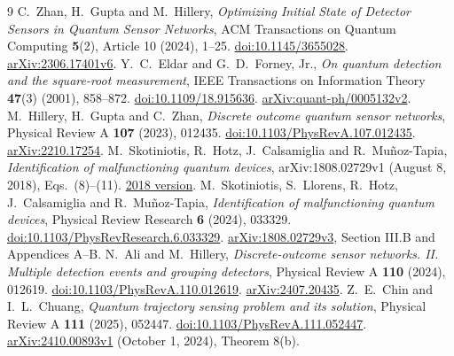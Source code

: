 \documentclass[11pt]{article}
\begin{document}
\begin{thebibliography}{9}
 C.~Zhan, H.~Gupta and M.~Hillery,
\emph{Optimizing Initial State of Detector Sensors in Quantum Sensor Networks},
ACM Transactions on Quantum Computing \textbf{5}(2), Article 10 (2024), 1--25.
\href{https://doi.org/10.1145/3655028}{doi:10.1145/3655028}.
\href{https://arxiv.org/abs/2306.17401v6}{arXiv:2306.17401v6}.
 Y.~C.~Eldar and G.~D.~Forney, Jr.,
\emph{On quantum detection and the square-root measurement},
IEEE Transactions on Information Theory \textbf{47}(3) (2001), 858--872.
\href{https://doi.org/10.1109/18.915636}{doi:10.1109/18.915636}.
\href{https://arxiv.org/abs/quant-ph/0005132v2}{arXiv:quant-ph/0005132v2}.
 M.~Hillery, H.~Gupta and C.~Zhan,
\emph{Discrete outcome quantum sensor networks},
Physical Review A \textbf{107} (2023), 012435.
\href{https://doi.org/10.1103/PhysRevA.107.012435}{doi:10.1103/PhysRevA.107.012435}.
\href{https://arxiv.org/abs/2210.17254}{arXiv:2210.17254}.
 M.~Skotiniotis, R.~Hotz, J.~Calsamiglia and
R.~Mu\~noz-Tapia, \emph{Identification of malfunctioning quantum devices},
arXiv:1808.02729v1 (August 8, 2018), Eqs.~(8)--(11).
\href{https://arxiv.org/abs/1808.02729v1}{2018 version}.
 M.~Skotiniotis, S.~Llorens, R.~Hotz, J.~Calsamiglia
and R.~Mu\~noz-Tapia, \emph{Identification of malfunctioning quantum devices},
Physical Review Research \textbf{6} (2024), 033329.
\href{https://doi.org/10.1103/PhysRevResearch.6.033329}{doi:10.1103/PhysRevResearch.6.033329}.
\href{https://arxiv.org/abs/1808.02729v3}{arXiv:1808.02729v3},
Section III.B and Appendices A--B.
 N.~Ali and M.~Hillery, \emph{Discrete-outcome sensor
networks. II. Multiple detection events and grouping detectors},
Physical Review A \textbf{110} (2024), 012619.
\href{https://doi.org/10.1103/PhysRevA.110.012619}{doi:10.1103/PhysRevA.110.012619}.
\href{https://arxiv.org/abs/2407.20435}{arXiv:2407.20435}.
 Z.~E.~Chin and I.~L.~Chuang,
\emph{Quantum trajectory sensing problem and its solution},
Physical Review A \textbf{111} (2025), 052447.
\href{https://doi.org/10.1103/PhysRevA.111.052447}{doi:10.1103/PhysRevA.111.052447}.
\href{https://arxiv.org/abs/2410.00893v1}{arXiv:2410.00893v1}
(October 1, 2024), Theorem 8(b).
\end{thebibliography}
\end{document}
